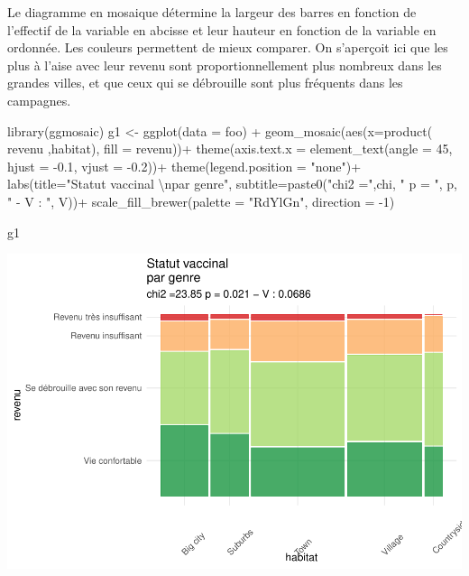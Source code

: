 \documentclass[
]{book}
\newenvironment{Shaded}{\begin{snugshade}}{\end{snugshade}}
\newcommand{\AttributeTok}[1]{\textcolor[rgb]{0.77,0.63,0.00}{#1}}
\newcommand{\DecValTok}[1]{\textcolor[rgb]{0.00,0.00,0.81}{#1}}
\newcommand{\FloatTok}[1]{\textcolor[rgb]{0.00,0.00,0.81}{#1}}
\newcommand{\FunctionTok}[1]{\textcolor[rgb]{0.00,0.00,0.00}{#1}}
\newcommand{\NormalTok}[1]{#1}
\newcommand{\OtherTok}[1]{\textcolor[rgb]{0.56,0.35,0.01}{#1}}
\newcommand{\SpecialCharTok}[1]{\textcolor[rgb]{0.00,0.00,0.00}{#1}}
\newcommand{\StringTok}[1]{\textcolor[rgb]{0.31,0.60,0.02}{#1}}
\begin{document}
Le diagramme en mosaique détermine la largeur des barres en fonction de l'effectif de la variable en abcisse et leur hauteur en fonction de la variable en ordonnée. Les couleurs permettent de mieux comparer.
On s'aperçoit ici que les plus à l'aise avec leur revenu sont proportionnellement plus nombreux dans les grandes villes, et que ceux qui se débrouille sont plus fréquents dans les campagnes.

\begin{Shaded}
\begin{Highlighting}[]
\FunctionTok{library}\NormalTok{(ggmosaic)}
\NormalTok{g1 }\OtherTok{\textless{}{-}} \FunctionTok{ggplot}\NormalTok{(}\AttributeTok{data =}\NormalTok{ foo) }\SpecialCharTok{+}
  \FunctionTok{geom\_mosaic}\NormalTok{(}\FunctionTok{aes}\NormalTok{(}\AttributeTok{x=}\FunctionTok{product}\NormalTok{( revenu ,habitat), }\AttributeTok{fill =}\NormalTok{ revenu))}\SpecialCharTok{+}  
  \FunctionTok{theme}\NormalTok{(}\AttributeTok{axis.text.x =} \FunctionTok{element\_text}\NormalTok{(}\AttributeTok{angle =} \DecValTok{45}\NormalTok{, }\AttributeTok{hjust =} \SpecialCharTok{{-}}\FloatTok{0.1}\NormalTok{, }\AttributeTok{vjust =} \SpecialCharTok{{-}}\FloatTok{0.2}\NormalTok{))}\SpecialCharTok{+} 
  \FunctionTok{theme}\NormalTok{(}\AttributeTok{legend.position =} \StringTok{"none"}\NormalTok{)}\SpecialCharTok{+}
  \FunctionTok{labs}\NormalTok{(}\AttributeTok{title=}\StringTok{"Statut vaccinal }\SpecialCharTok{\textbackslash{}n}\StringTok{par genre"}\NormalTok{, }
       \AttributeTok{subtitle=}\FunctionTok{paste0}\NormalTok{(}\StringTok{"chi2 ="}\NormalTok{,chi, }\StringTok{" p = "}\NormalTok{, p, }\StringTok{" {-} V : "}\NormalTok{, V))}\SpecialCharTok{+}    
  \FunctionTok{scale\_fill\_brewer}\NormalTok{(}\AttributeTok{palette =} \StringTok{"RdYlGn"}\NormalTok{, }\AttributeTok{direction =} \SpecialCharTok{{-}}\DecValTok{1}\NormalTok{) }

\NormalTok{g1}
\end{Highlighting}
\end{Shaded}

\includegraphics{bookdown-demo_files/figure-latex/0428-1.pdf}
\end{document}
